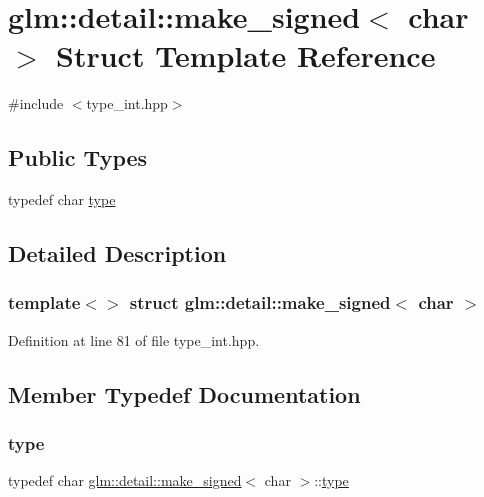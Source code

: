 \hypertarget{structglm_1_1detail_1_1make__signed_3_01char_01_4}{}\section{glm\+::detail\+::make\+\_\+signed$<$ char $>$ Struct Template Reference}
\label{structglm_1_1detail_1_1make__signed_3_01char_01_4}


{\ttfamily \#include $<$type\+\_\+int.\+hpp$>$}

\subsection*{Public Types}
\begin{DoxyCompactItemize}
\item 
typedef char \mbox{\hyperlink{structglm_1_1detail_1_1make__signed_3_01char_01_4_ad92111512e0af83393df0905896d478f}{type}}
\end{DoxyCompactItemize}


\subsection{Detailed Description}
\subsubsection*{template$<$$>$\newline
struct glm\+::detail\+::make\+\_\+signed$<$ char $>$}



Definition at line 81 of file type\+\_\+int.\+hpp.



\subsection{Member Typedef Documentation}
\mbox{\label{structglm_1_1detail_1_1make__signed_3_01char_01_4_ad92111512e0af83393df0905896d478f}} 
\subsubsection{\texorpdfstring{type}{type}}
{\footnotesize\ttfamily typedef char \mbox{\hyperlink{structglm_1_1detail_1_1make__signed}{glm\+::detail\+::make\+\_\+signed}}$<$ char $>$\+::\mbox{\hyperlink{structglm_1_1detail_1_1make__signed_3_01char_01_4_ad92111512e0af83393df0905896d478f}{type}}}



